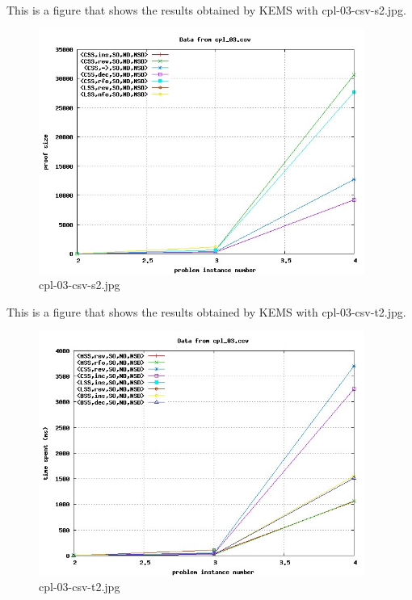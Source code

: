 This is a figure that shows the results obtained by KEMS with cpl-03-csv-s2.jpg.
\begin{figure}[htbp]
\begin{center}
\includegraphics[width=0.95\textwidth]{figuras/cpl-03-csv-s2.jpg}
\end{center}
\caption{cpl-03-csv-s2.jpg}
\end{figure}

This is a figure that shows the results obtained by KEMS with cpl-03-csv-t2.jpg.
\begin{figure}[htbp]
\begin{center}
\includegraphics[width=0.95\textwidth]{figuras/cpl-03-csv-t2.jpg}
\end{center}
\caption{cpl-03-csv-t2.jpg}
\end{figure}

